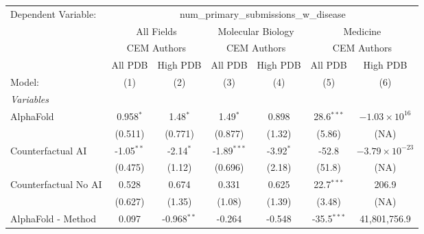 \begingroup
\centering
\begin{tabular}{lcccccc}
   \tabularnewline \midrule \midrule
   Dependent Variable: & \multicolumn{6}{c}{num\_primary\_submissions\_w\_disease}\\
 & \multicolumn{2}{c}{All Fields} & \multicolumn{2}{c}{Molecular Biology} & \multicolumn{2}{c}{Medicine} \\
\cmidrule(lr){2-3} \cmidrule(lr){4-5} \cmidrule(lr){6-7}
 & \multicolumn{2}{c}{CEM Authors} & \multicolumn{2}{c}{CEM Authors} & \multicolumn{2}{c}{CEM Authors} \\
\cmidrule(lr){2-3} \cmidrule(lr){4-5} \cmidrule(lr){6-7}
 & \multicolumn{1}{c}{All PDB} & \multicolumn{1}{c}{High PDB} & \multicolumn{1}{c}{All PDB} & \multicolumn{1}{c}{High PDB} & \multicolumn{1}{c}{All PDB} & \multicolumn{1}{c}{High PDB} \\
\cmidrule(lr){2-2} \cmidrule(lr){3-3} \cmidrule(lr){4-4} \cmidrule(lr){5-5} \cmidrule(lr){6-6} \cmidrule(lr){7-7}
   Model:                                                     & (1)          & (2)           & (3)           & (4)         & (5)            & (6)\\  
   \midrule
   \emph{Variables}\\
   AlphaFold                                                  & 0.958$^{*}$  & 1.48$^{*}$    & 1.49$^{*}$    & 0.898       & 28.6$^{***}$   & $-1.03\times 10^{16}$\\    
                                                              & (0.511)      & (0.771)       & (0.877)       & (1.32)      & (5.86)         & (NA)\\   
   Counterfactual AI                                          & -1.05$^{**}$ & -2.14$^{*}$   & -1.89$^{***}$ & -3.92$^{*}$ & -52.8          & $-3.79\times 10^{-23}$\\    
                                                              & (0.475)      & (1.12)        & (0.696)       & (2.18)      & (51.8)         & (NA)\\   
   Counterfactual No AI                                       & 0.528        & 0.674         & 0.331         & 0.625       & 22.7$^{***}$   & 206.9\\   
                                                              & (0.627)      & (1.35)        & (1.08)        & (1.39)      & (3.48)         & (NA)\\   
   AlphaFold - Method                                         & 0.097        & -0.968$^{**}$ & -0.264        & -0.548      & -35.5$^{***}$  & 41,801,756.9\\   

\end{tabular}
